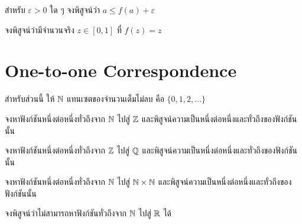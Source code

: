 \begin{exercise}
สำหรับ $\varepsilon > 0$ ใด ๆ จงพิสูจน์ว่า $a \leq f(a) + \varepsilon$
\end{exercise}

\begin{exercise}
จงพิสูจน์ว่ามีจำนวนจริง $z \in [0, 1]$ ที่ $f(z) = z$
\end{exercise}

\section{One-to-one Correspondence}

สำหรับส่วนนี้ ให้ $\mathbb{N}$ แทนเซตของจำนวนเต็มไม่ลบ คือ $\{0, 1, 2, \dots\}$

\begin{exercise}
จงหาฟังก์ชันหนึ่งต่อหนึ่งทั่วถึงจาก $\mathbb{N}$ ไปสู่ $\mathbb{Z}$ และพิสูจน์ความเป็นหนึ่งต่อหนึ่งและทั่วถึงของฟังก์ชันนั้น
\end{exercise}

\begin{exercise}
จงหาฟังก์ชันหนึ่งต่อหนึ่งทั่วถึงจาก $\mathbb{Z}$ ไปสู่ $\mathbb{Q}$ และพิสูจน์ความเป็นหนึ่งต่อหนึ่งและทั่วถึงของฟังก์ชันนั้น
\end{exercise}

\begin{exercise}
จงหาฟังก์ชันหนึ่งต่อหนึ่งทั่วถึงจาก $\mathbb{N}$ ไปสู่ $\mathbb{N} \times \mathbb{N}$ และพิสูจน์ความเป็นหนึ่งต่อหนึ่งและทั่วถึงของฟังก์ชันนั้น
\end{exercise}

\begin{bonus}
จงพิสูจน์ว่าไม่สามารถหาฟังก์ชันทั่วถึงจาก $\mathbb{N}$ ไปสู่ $\mathbb{R}$ ได้
\end{bonus}